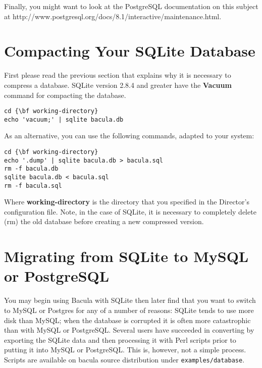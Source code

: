 Finally, you might want to look at the PostgreSQL documentation on
this subject at
{http://www.postgresql.org/docs/8.1/interactive/maintenance.html}.  

\section{Compacting Your SQLite Database}

First please read the previous section that explains why it is necessary to
compress a database. SQLite version 2.8.4 and greater have the {\bf Vacuum}
command for compacting the database. 

\footnotesize
\begin{verbatim}
cd {\bf working-directory}
echo 'vacuum;' | sqlite bacula.db
\end{verbatim}
\normalsize

As an alternative, you can use the following commands, adapted to your system:


\footnotesize
\begin{verbatim}
cd {\bf working-directory}
echo '.dump' | sqlite bacula.db > bacula.sql
rm -f bacula.db
sqlite bacula.db < bacula.sql
rm -f bacula.sql
\end{verbatim}
\normalsize

Where {\bf working-directory} is the directory that you specified in the
Director's configuration file. Note, in the case of SQLite, it is necessary to
completely delete (rm) the old database before creating a new compressed
version. 

\section{Migrating from SQLite to MySQL or PostgreSQL}

You may begin using Bacula with SQLite then later find that you want to switch
to MySQL or Postgres for any of a number of reasons: SQLite tends to use more
disk than MySQL; when the database is corrupted it is often more catastrophic
than with MySQL or PostgreSQL.  Several users have succeeded in converting by
exporting the SQLite data and then processing it with Perl scripts prior to
putting it into MySQL or PostgreSQL. This is, however, not a simple process.
Scripts are available on bacula source distribution under
\texttt{examples/database}.

